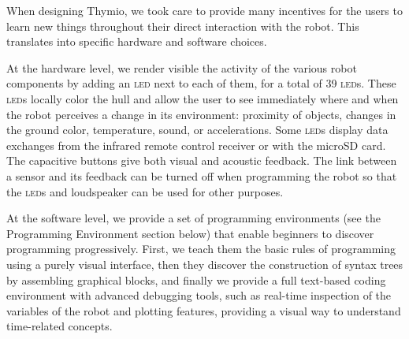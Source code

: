 \documentclass[letterpaper, 10 pt, conference]{ieeeconf}  %
\begin{document}
When designing Thymio, we took care to provide many incentives for the users to learn new things throughout their direct interaction with the robot.
This translates into specific hardware and software choices.

At the hardware level, we render visible the activity of the various robot components by adding an \textsc{led} next to each of them, for a total of 39 \textsc{led}s.
These \textsc{led}s locally color the hull and allow the user to see immediately where and when the robot perceives a change in its environment: proximity of objects, changes in the ground color, temperature, sound, or accelerations.
Some \textsc{led}s display data exchanges from the infrared remote control receiver or with the microSD card. 
The capacitive buttons give both visual and acoustic feedback.
The link between a sensor and its feedback can be turned off when programming the robot so that the \textsc{led}s and loudspeaker can be used for other purposes.

At the software level, we provide a set of programming environments (see the Programming Environment section below) that enable beginners to discover programming progressively.
First, we teach them the basic rules of programming using a purely visual interface, then they discover the construction of syntax trees by assembling graphical blocks, and finally we provide a full text-based coding environment with advanced debugging tools, such as real-time inspection of the variables of the robot and plotting features, providing a visual way to understand time-related concepts.
\end{document}
